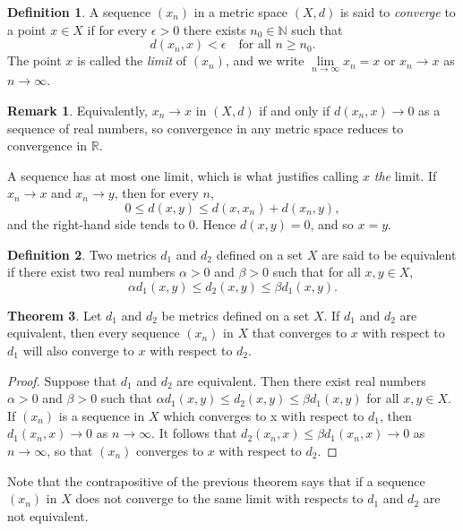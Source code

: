 \documentclass[11pt,a4paper]{article}
\theoremstyle{definition}
\newtheorem{thm}{Theorem}[subsection]
\newtheorem{defn}[thm]{Definition}
\newtheorem*{remark}{Remark}
\begin{document}
\begin{defn}
A sequence $(x_n)$ in a metric space $(X,d)$ is said to \emph{converge} to a point $x\in X$ if for every $\epsilon>0$ there exists $n_0\in\mathbb{N}$ such that
$$d(x_n,x)<\epsilon \quad\text{for all } n\geq n_0.$$
The point $x$ is called the \emph{limit} of $(x_n)$, and we write $\lim\limits_{n\rightarrow\infty} x_n=x$ or $x_n\rightarrow x$ as $n\rightarrow\infty$.
\end{defn}

\begin{remark}
Equivalently, $x_n\rightarrow x$ in $(X,d)$ if and only if $d(x_n,x)\rightarrow 0$ as a sequence of real numbers, so convergence in any metric space reduces to convergence in $\mathbb{R}$.

A sequence has at most one limit, which is what justifies calling $x$ \emph{the} limit. If $x_n\rightarrow x$ and $x_n\rightarrow y$, then for every $n$,
$$0\leq d(x,y)\leq d(x,x_n)+d(x_n,y),$$
and the right-hand side tends to $0$. Hence $d(x,y)=0$, and so $x=y$.
\end{remark}


\begin{defn}
Two metrics $d_1$ and $d_2$ defined on a set $X$ are said to be equivalent if there exist two real numbers $\alpha >0$ and $\beta >0$ such that for all $x,y\in X $,$$\alpha d_1(x,y)\leq d_2(x,y)\leq \beta d_1(x,y).$$
\end{defn}


\begin{thm}
Let $d_1$ and $d_2$ be metrics defined on a set $X$. If $d_1$ and $d_2$ are equivalent, then every sequence $(x_n)$ in $X$ that converges to $x$ with respect to $d_1$ will also converge to $x$ with respect to $d_2$.
\end{thm}


\begin{proof}
Suppose that $d_1$ and $d_2$ are equivalent. Then there exist real numbers $\alpha >0$ and $\beta >0$ such that $\alpha d_1(x,y)\leq d_2(x,y)\leq \beta d_1(x,y)$ for all $x,y\in X$. If $(x_n)$ is a sequence in $X$ which converges to x with respect to $d_1$, then $d_1(x_n,x)\rightarrow 0$ as $n\rightarrow \infty$. It follows that $d_2(x_n,x)\leq \beta d_1(x_n,x)\rightarrow 0$ as $n\rightarrow \infty$, so that $(x_n)$ converges to $x$ with respect to $d_2$.
\end{proof}

Note that the contrapositive of the previous theorem says that if a sequence $(x_n)$ in $X$ does not converge to the same limit with respects to $d_1$ and $d_2$ are not equivalent.
\end{document}
